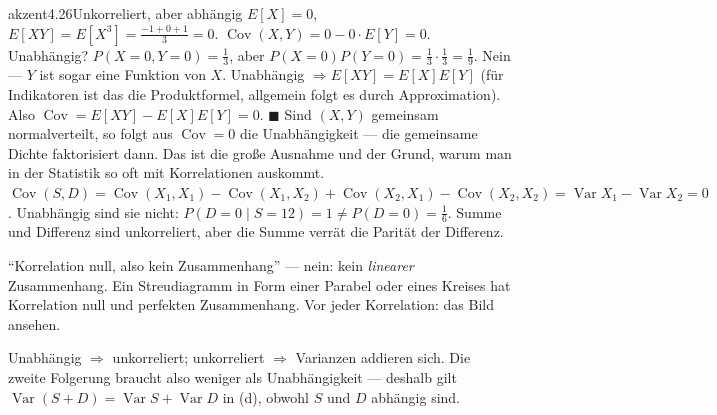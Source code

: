 \begin{loesungkarte}{akzent}{4.26}{Unkorreliert, aber abhängig}
$E[X] = 0$, $E[XY] = E[X^{3}] = \frac{-1 + 0 + 1}3 = 0$. $\operatorname{Cov}(X, Y) = 0 - 0\cdot E[Y] = 0$. Unabhängig? $P(X = 0, Y = 0) = \frac13$, aber $P(X = 0)P(Y = 0) = \frac13\cdot\frac13 = \frac19$. Nein --- $Y$ ist sogar eine Funktion von $X$.
Unabhängig $\Rightarrow E[XY] = E[X]E[Y]$ (für Indikatoren ist das die Produktformel, allgemein folgt es durch Approximation). Also $\operatorname{Cov} = E[XY] - E[X]E[Y] = 0$. $\blacksquare$
Sind $(X, Y)$ gemeinsam normalverteilt, so folgt aus $\operatorname{Cov} = 0$ die Unabhängigkeit --- die gemeinsame Dichte faktorisiert dann. Das ist die große Ausnahme und der Grund, warum man in der Statistik so oft mit Korrelationen auskommt.
$\operatorname{Cov}(S, D) = \operatorname{Cov}(X_1, X_1) - \operatorname{Cov}(X_1, X_2) + \operatorname{Cov}(X_2, X_1) - \operatorname{Cov}(X_2, X_2) = \operatorname{Var}X_1 - \operatorname{Var}X_2 = 0$. Unabhängig sind sie nicht: $P(D = 0\mid S = 12) = 1\neq P(D = 0) = \frac16$. Summe und Differenz sind unkorreliert, aber die Summe verrät die Parität der Differenz.
\begin{fehler}\kastentext
\enquote{Korrelation null, also kein Zusammenhang} --- nein: kein \emph{linearer} Zusammenhang. Ein Streudiagramm in Form einer Parabel oder eines Kreises hat Korrelation null und perfekten Zusammenhang. Vor jeder Korrelation: das Bild ansehen.
\end{fehler}
\begin{mitnehmen}\kastentext
Unabhängig $\Rightarrow$ unkorreliert; unkorreliert $\Rightarrow$ Varianzen addieren sich. Die zweite Folgerung braucht also weniger als Unabhängigkeit --- deshalb gilt $\operatorname{Var}(S + D) = \operatorname{Var}S + \operatorname{Var}D$ in (d), obwohl $S$ und $D$ abhängig sind.
\end{mitnehmen}
\end{loesungkarte}

